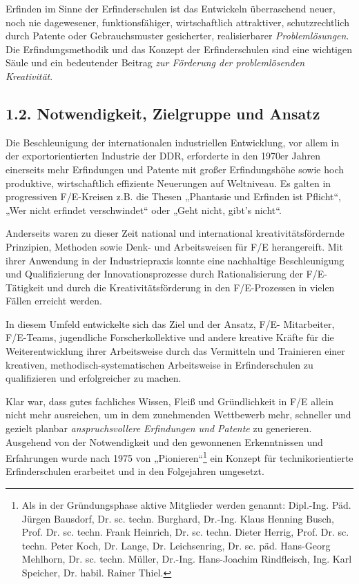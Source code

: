 \documentclass[11pt,a4paper]{article}
\begin{document}
Erfinden im Sinne der Erfinderschulen ist das Entwickeln überraschend neuer,
noch nie dagewesener, funktionsfähiger, wirtschaftlich attraktiver,
schutzrechtlich durch Patente oder Gebrauchsmuster gesicherter, realisierbarer
\emph{Problemlösungen}. Die Erfindungsmethodik und das Konzept der
Erfinderschulen sind eine wichtigen Säule und ein bedeutender Beitrag
\emph{zur Förderung der problemlösenden Kreativität}.

\subsection*{1.2. Notwendigkeit, Zielgruppe und Ansatz}
Die Beschleunigung der internationalen industriellen Entwicklung, vor allem in
der exportorientierten Industrie der DDR, erforderte in den 1970er Jahren
einerseits mehr Erfindungen und Patente mit großer Erfindungshöhe sowie hoch
produktive, wirtschaftlich effiziente Neuerungen auf Weltniveau. Es galten in
progressiven F/E-Kreisen z.B. die Thesen „Phantasie und Erfinden ist Pflicht“,
„Wer nicht erfindet verschwindet“ oder „Geht nicht, gibt’s nicht“.

Anderseits waren zu dieser Zeit national und international
kreativitätsfördernde Prinzipien, Methoden sowie Denk- und Arbeitsweisen für
F/E herangereift. Mit ihrer Anwendung in der Industriepraxis konnte eine
nachhaltige Beschleunigung und Qualifizierung der Innovationsprozesse durch
Rationalisierung der F/E-Tätigkeit und durch die Kreativitätsförderung in den
F/E-Prozessen in vielen Fällen erreicht werden.

In diesem Umfeld entwickelte sich das Ziel und der Ansatz, F/E- Mitarbeiter,
F/E-Teams, jugendliche Forscherkollektive und andere kreative Kräfte für die
Weiterentwicklung ihrer Arbeitsweise durch das Vermitteln und Trainieren einer
kreativen, methodisch-systematischen Arbeitsweise in Erfinderschulen zu
qualifizieren und erfolgreicher zu machen.

Klar war, dass gutes fachliches Wissen, Fleiß und Gründlichkeit in F/E allein
nicht mehr ausreichen, um in dem zunehmenden Wettbewerb mehr, schneller und
gezielt planbar \emph{anspruchsvollere Erfindungen und Patente} zu generieren.
Ausgehend von der Notwendigkeit und den gewonnenen Erkenntnissen und
Erfahrungen wurde nach 1975 von „Pionieren“\footnote{Als in der Gründungsphase
aktive Mitglieder werden genannt: Dipl.-Ing. Päd. Jürgen Bausdorf,
Dr. sc. techn. Burghard, Dr.-Ing. Klaus Henning Busch,
Prof. Dr. sc. techn. Frank Heinrich, Dr. sc. techn. Dieter Herrig,
Prof. Dr. sc. techn. Peter Koch, Dr. Lange, Dr. Leichsenring,
Dr. sc. päd. Hans-Georg Mehlhorn, Dr. sc. techn. Müller, Dr.-Ing. Hans-Joachim
Rindfleisch, Ing. Karl Speicher, Dr. habil. Rainer Thiel.} ein Konzept für
technikorientierte Erfinderschulen erarbeitet und in den Folgejahren
umgesetzt.
\end{document}
